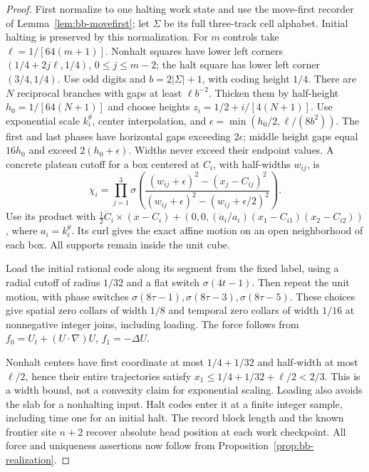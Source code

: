 \begin{proof}\label{proof:bb-mid-direct-torus}
First normalize to one halting work state and use the move-first recorder
of Lemma~\ref{lem:bb-movefirst}; let $\Sigma$ be its full three-track
cell alphabet. Initial halting is preserved by this normalization.
For $m$ controls take $\ell=1/[64(m+1)]$.  Nonhalt squares have
lower left corners $(1/4+2j\ell,1/4)$, $0\le j\le m-2$;
the halt square has lower left corner $(3/4,1/4)$.
Use odd digits and $b=2|\Sigma|+1$, with coding height $1/4$.
There are $N$ reciprocal branches with gaps at least $\ell b^{-2}$.
Thicken them by half-height $h_0=1/[64(N+1)]$ and choose heights
$z_i=1/2+i/[4(N+1)]$.  Use exponential scale $k_i^\theta$,
center interpolation, and
$\epsilon=\min(h_0/2,\ell/(8b^2))$.
The first and last phases have horizontal gaps exceeding
$2\epsilon$; middle height gaps equal $16h_0$ and exceed
$2(h_0+\epsilon)$.  Widths never exceed their endpoint values.
A concrete plateau cutoff for a box centered at $C_i$, with
half-widths $w_{ij}$, is
\[
 \chi_i=\prod_{j=1}^3\sigma\!\left(
 \frac{(w_{ij}+\epsilon)^2-(x_j-C_{ij})^2}
 {(w_{ij}+\epsilon)^2-(w_{ij}+\epsilon/2)^2}\right).
\]
Use its product with
$\tfrac12\dot C_i\times(x-C_i)+(0,0,(\dot a_i/a_i)(x_1-C_{i1})(x_2-C_{i2}))$,
where $a_i=k_i^\theta$.  Its curl gives the exact affine motion on
an open neighborhood of each box.  All supports remain inside the
unit cube.

Load the initial rational code along its segment from the fixed
label, using a radial cutoff of radius $1/32$ and a flat switch
$\sigma(4t-1)$.  Then repeat the unit motion, with phase switches
$\sigma(8\tau-1),\sigma(8\tau-3),\sigma(8\tau-5)$.
These choices give spatial zero collars of width $1/8$ and temporal
zero collars of width $1/16$ at nonnegative integer joins, including
loading.  The force follows from
$f_0=U_t+(U\cdot\nabla)U$, $f_1=-\Delta U$.

Nonhalt centers have first coordinate at most $1/4+1/32$ and
half-width at most $\ell/2$, hence their entire trajectories satisfy
$x_1\le1/4+1/32+\ell/2<2/3$.  This is a width bound, not a convexity
claim for exponential scaling.  Loading also avoids the slab for a
nonhalting input.  Halt codes enter it at a finite integer sample,
including time one for an initial halt.  The record block length and
the known frontier site $n+2$ recover absolute head position at each
work checkpoint.  All force and uniqueness assertions now follow
from Proposition~\ref{prop:bb-realization}.
\end{proof}

